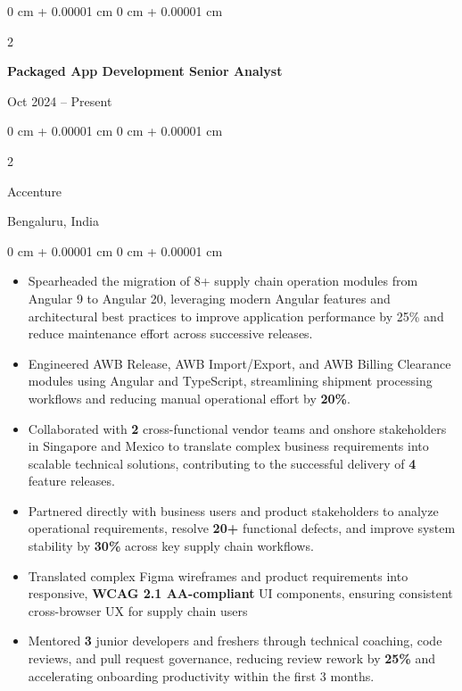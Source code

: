 \documentclass[10pt, letterpaper]{article}
\newenvironment{highlights}{
    \begin{itemize}[
        topsep=0.10 cm,
        parsep=0.10 cm,
        partopsep=0pt,
        itemsep=0pt,
        leftmargin=0 cm + 10pt
    ]
}{
    \end{itemize}
} %
\newenvironment{onecolentry}{
    \begin{adjustwidth}{
        0 cm + 0.00001 cm
    }{
        0 cm + 0.00001 cm
    }
}{
    \end{adjustwidth}
} %
\newenvironment{twocolentry}[2][]{
    \onecolentry
    \def\secondColumn{#2}
    \setcolumnwidth{\fill, 4.5 cm}
    \begin{paracol}{2}
}{
    \switchcolumn \raggedleft \secondColumn
    \end{paracol}
    \endonecolentry
} %
\begin{document}
        \begin{twocolentry}
            {Oct 2024 – Present}
            \textbf{Packaged App Development Senior Analyst} 
        \end{twocolentry}
            \begin{twocolentry}
            {Bengaluru, India} 
            {Accenture} 
        \end{twocolentry}
        \vspace{0.10 cm}
        \begin{onecolentry}
            \begin{highlights}
                \item Spearheaded the migration of 8+ supply chain operation modules from Angular 9 to Angular 20, leveraging modern Angular features and architectural best practices to improve application performance by 25\% and reduce maintenance effort across successive releases.
                
                \item Engineered AWB Release, AWB Import/Export, and AWB Billing Clearance modules using Angular and TypeScript, streamlining shipment processing workflows and reducing manual operational effort by \textbf{20\%}.

                \item Collaborated with \textbf{2} cross-functional vendor teams and onshore stakeholders in Singapore and Mexico to translate complex business requirements into scalable technical solutions, contributing to the successful delivery of \textbf{4} feature releases.

                \item Partnered directly with business users and product stakeholders to analyze operational requirements, resolve \textbf{20+} functional defects, and improve system stability by \textbf{30\%} across key supply chain workflows.

                \item Translated complex Figma wireframes and product requirements into responsive, \textbf{WCAG 2.1 AA-compliant} UI components, ensuring consistent cross-browser UX for supply chain users

                \item Mentored \textbf{3} junior developers and freshers through technical coaching, code reviews, and pull request governance, reducing review rework by \textbf{25\%} and accelerating onboarding productivity within the first 3 months.


\end{highlights}
\end{onecolentry}
\end{document}
